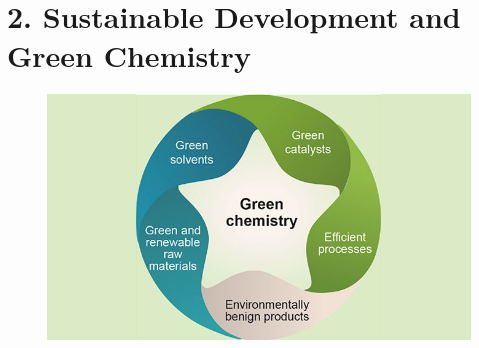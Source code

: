 \documentclass[11pt]{article}
\begin{document}
\section{2. Sustainable Development and Green Chemistry}

\begin{figure}[H]
	\centering
	\includegraphics[width=.95\textwidth]{green-chemistry-1.jpg}
\end{figure}
\end{document}
